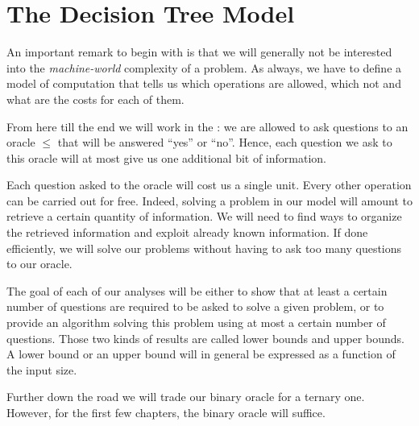 \section{The Decision Tree Model}
\label{tree:sorting:model}

An important remark to begin with is that we will generally not be interested
into the \emph{machine-world} complexity of a problem. As always, we have to
define a model of computation that tells us which operations are allowed, which
not and what are the costs for each of them.

From here till the end we will work in the :
we are allowed to ask questions to an oracle \(\le\) that will be answered
``yes'' or ``no''. Hence, each question we ask to this oracle will at most give
us one additional bit of information.

Each question asked to the oracle will cost us a single unit.
Every other operation can be carried out for free. Indeed, solving a problem in
our model will amount to retrieve a certain quantity of information. We will
need to find ways to organize the retrieved information and exploit already
known information. If done efficiently, we will solve our problems without
having to ask too many questions to our oracle.

The goal of each of our analyses will be either to show that at least a certain
number of questions are required to be asked to solve a given problem, or to
provide an algorithm solving this problem using at most a certain number of
questions. Those two kinds of results are called lower bounds and upper bounds.
A lower bound or an upper bound will in general be expressed as a function of
the input size.

Further down the road we will trade our binary oracle for a ternary one.
However, for the first few chapters, the binary oracle will suffice.

